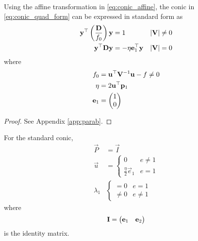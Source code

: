
\begin{theorem}
Using the affine transformation in
\eqref{eq:conic_affine},
	the conic in     \eqref{eq:conic_quad_form} can be expressed in standard form 
	as
  \begin{align}
    \label{eq:conic_simp_temp_nonparab}
	    \mathbf{y}^{\top}\left(\frac{\mathbf{D}}{f_0}\right)\mathbf{y} &= 1   &  \left\vert\mathbf{V}\right\vert &\ne 0
    \\
	    \mathbf{y}^{\top}\mathbf{D}\mathbf{y} &=  -\eta\mathbf{e}_1^{\top}\mathbf{y}   & \left\vert\mathbf{V}\right\vert &= 0
    \label{eq:conic_simp_temp_parab}
    \end{align}
    where
  \begin{align}
      \label{eq:f0}
	  f_0 &=\mathbf{u}^{\top}\mathbf{V}^{-1}\mathbf{u} -f \ne 0
	  \\
      \label{eq:eta}
       \eta &=2\mathbf{u}^{\top}\mathbf{p}_1
       \\
       \mathbf{e}_1 &=\begin{pmatrix}1 \\ 0\end{pmatrix}
      \end{align}
     
    \end{theorem}
\begin{proof}
  See Appendix \ref{app:parab}.
  \end{proof}
	  \begin{corollary}
		For the standard conic, 
				\begin{align}
					\label{eq:std-prm-P}
					\vec{P} &= \vec{I}
					\\
					\vec{u} &= 
				\begin{cases}
				0 & e \ne 1
       \\
				\frac{\eta}{2} \vec{e}_1 & e = 1
				\end{cases}
				\label{eq:std-prm-u}
				\\
				\lambda_1 &  
					\begin{cases}
						=0 & e = 1
						\\
						\ne 0 & e \ne 1
					\end{cases}
				\label{eq:std-prm-lam1}
				\end{align}
				where 
				\begin{align}
					\mathbf{I} = \begin{pmatrix}\mathbf{e}_1 & \mathbf{e}_2\end{pmatrix}
				\end{align}
				is the identity matrix.
	  \end{corollary}
